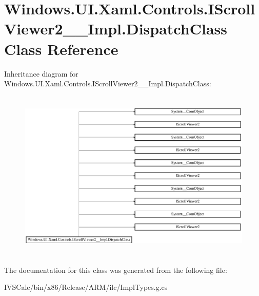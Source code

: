 \hypertarget{class_windows_1_1_u_i_1_1_xaml_1_1_controls_1_1_i_scroll_viewer2_____impl_1_1_dispatch_class}{}\section{Windows.\+U\+I.\+Xaml.\+Controls.\+I\+Scroll\+Viewer2\+\_\+\+\_\+\+Impl.\+Dispatch\+Class Class Reference}
\label{class_windows_1_1_u_i_1_1_xaml_1_1_controls_1_1_i_scroll_viewer2_____impl_1_1_dispatch_class}
Inheritance diagram for Windows.\+U\+I.\+Xaml.\+Controls.\+I\+Scroll\+Viewer2\+\_\+\+\_\+\+Impl.\+Dispatch\+Class\+:\begin{figure}[H]
\begin{center}
\leavevmode
\includegraphics[height=8.213333cm]{class_windows_1_1_u_i_1_1_xaml_1_1_controls_1_1_i_scroll_viewer2_____impl_1_1_dispatch_class}
\end{center}
\end{figure}


The documentation for this class was generated from the following file\+:\begin{DoxyCompactItemize}
\item 
I\+V\+S\+Calc/bin/x86/\+Release/\+A\+R\+M/ilc/Impl\+Types.\+g.\+cs\end{DoxyCompactItemize}
